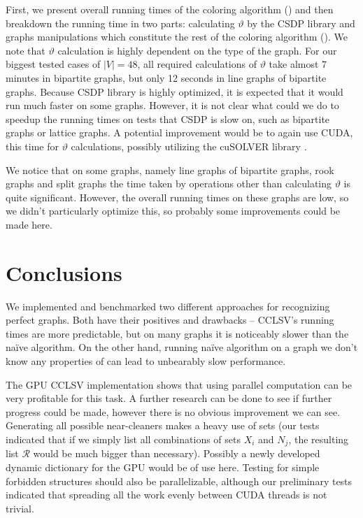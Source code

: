 First, we present overall running times of the coloring algorithm () and then breakdown the running time in two parts: calculating $\vartheta$ by the CSDP library and graphs manipulations which constitute the rest of the coloring algorithm (). We note that $\vartheta$ calculation is highly dependent on the type of the graph. For our biggest tested cases of $|V| = 48$, all required calculations of $\vartheta$ take almost 7 minutes in bipartite graphs, but only 12 seconds in line graphs of bipartite graphs. Because CSDP library is highly optimized, it is expected that it would run much faster on some graphs. However, it is not clear what could we do to speedup the running times on tests that CSDP is slow on, such as bipartite graphs or lattice graphs. A potential improvement would be to again use CUDA, this time for $\vartheta$ calculations, possibly utilizing the cuSOLVER library \cite{cusolver}.


We notice that on some graphs, namely line graphs of bipartite graphs, rook graphs and split graphs the time taken by operations other than calculating $\vartheta$ is quite significant. However, the overall running times on these graphs are low, so we didn't particularly optimize this, so probably some improvements could be made here.

\section{Conclusions}
We implemented and benchmarked two different approaches for recognizing perfect graphs. Both have their positives and drawbacks -- CCLSV's running times are more predictable, but on many graphs it is noticeably slower than the na\"ive algorithm. On the other hand, running na\"ive algorithm on a graph we don't know any properties of can lead to unbearably slow performance.

The GPU CCLSV implementation shows that using parallel computation can be very profitable for this task. A further research can be done to see if further progress could be made, however there is no obvious improvement we can see. Generating all possible near-cleaners makes a heavy use of sets (our tests indicated that if we simply list all combinations of sets $X_i$ and $N_j$, the resulting list $\mathcal{R}$ would be much bigger than necessary). Possibly a newly developed dynamic dictionary for the GPU \cite{Ashkiani2018} would be of use here. Testing for simple forbidden structures should also be parallelizable, although our preliminary tests indicated that spreading all the work evenly between CUDA threads is not trivial.


